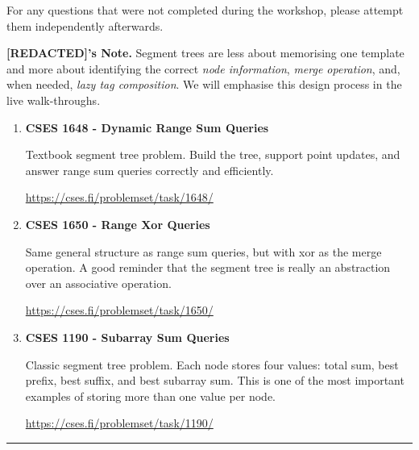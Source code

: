 \documentclass[11pt]{article}
\begin{document}
For any questions that were not completed during the workshop, please attempt
them independently afterwards.

\textbf{[REDACTED]'s Note.} Segment trees are less about memorising one template
and more about identifying the correct \emph{node information},
\emph{merge operation}, and, when needed, \emph{lazy tag composition}. We will
emphasise this design process in the live walk-throughs.

\begin{enumerate}
    \item \textbf{CSES 1648 - Dynamic Range Sum Queries}

    Textbook segment tree problem. Build the tree, support point updates, and
    answer range sum queries correctly and efficiently.

    \vspace{0.3em}
    {\url{https://cses.fi/problemset/task/1648/}}

    \vspace{0.8em}

    \item \textbf{CSES 1650 - Range Xor Queries}

    Same general structure as range sum queries, but with xor as the merge
    operation. A good reminder that the segment tree is really an abstraction
    over an associative operation.

    \vspace{0.3em}
    {\url{https://cses.fi/problemset/task/1650/}}

    \vspace{0.8em}

    \item \textbf{CSES 1190 - Subarray Sum Queries}

    Classic segment tree problem. Each node stores four values:
    total sum, best prefix, best suffix, and best subarray sum.
    This is one of the most important examples of storing more than one value
    per node.

    \vspace{0.3em}
    {\url{https://cses.fi/problemset/task/1190/}}

    \vspace{0.8em}

\end{enumerate}

\vspace{1em}
\hrule
\vspace{1em}

\end{document}
